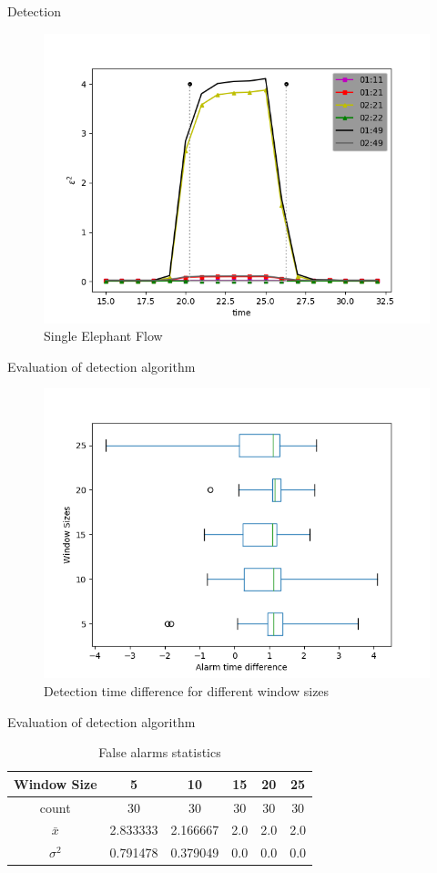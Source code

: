\documentclass[aspectratio=43]{beamer}
\begin{document}
\begin{frame}{Detection}
    \begin{figure}
        \includegraphics[width=.9\textwidth]{meter_eleph/single_elephant_flow}
        \caption{Single Elephant Flow}
    \end{figure}
\end{frame}

\begin{frame}{Evaluation of detection algorithm}
    \begin{figure}
        \includegraphics[width=.7\textwidth]{meter_eleph/time_error}
        \caption{Detection time difference for different window sizes}
    \end{figure}
\end{frame}

\begin{frame}{Evaluation of detection algorithm}
    \begin{table}[]
        \centering
        \caption{False alarms statistics}
        \label{tab:false_alarms}
        \begin{tabular}{|c|c|c|c|c|c|}
            \hline
            Window Size   & 5        & 10       & 15  & 20  & 25  \\ \hline
            count         & 30       & 30       & 30  & 30  & 30  \\ \hline
            $\bar{x}$            & 2.833333 & 2.166667 & 2.0 & 2.0 & 2.0 \\ \hline
            $\sigma^2$& 0.791478 & 0.379049 & 0.0 & 0.0 & 0.0 \\ \hline
        \end{tabular}
    \end{table}
\end{frame}
\end{document}
